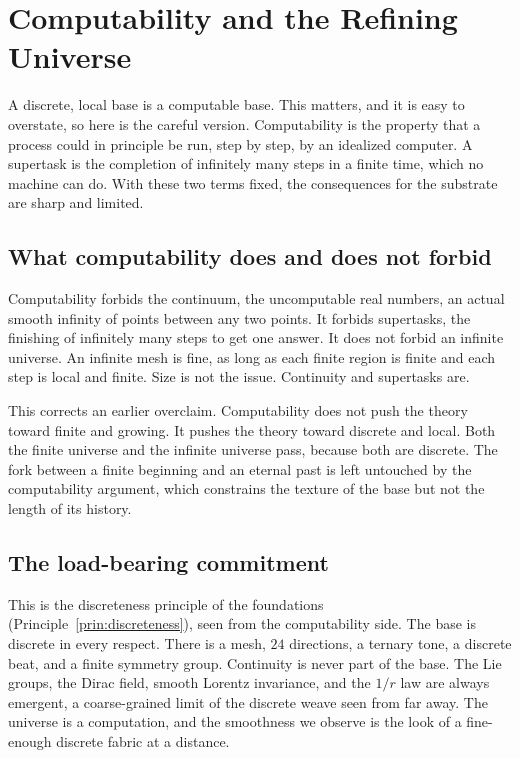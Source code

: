 \section{Computability and the Refining Universe}

A discrete, local base is a computable base. This matters, and it is easy to overstate, so here is the careful
version. Computability is the property that a process could in principle be run, step by step, by an idealized
computer. A supertask is the completion of infinitely many steps in a finite time, which no machine can do. With
these two terms fixed, the consequences for the substrate are sharp and limited.

\subsection{What computability does and does not forbid}

Computability forbids the continuum, the uncomputable real numbers, an actual smooth infinity of points between
any two points. It forbids supertasks, the finishing of infinitely many steps to get one answer. It does not
forbid an infinite universe. An infinite mesh is fine, as long as each finite region is finite and each step is
local and finite. Size is not the issue. Continuity and supertasks are.

This corrects an earlier overclaim. Computability does not push the theory toward finite and growing. It pushes
the theory toward discrete and local. Both the finite universe and the infinite universe pass, because both are
discrete. The fork between a finite beginning and an eternal past is left untouched by the computability argument,
which constrains the texture of the base but not the length of its history.

\subsection{The load-bearing commitment}

This is the discreteness principle of the foundations (Principle~\ref{prin:discreteness}), seen from the
computability side. The base is discrete in every respect. There is a mesh, $24$ directions, a ternary tone, a
discrete beat, and a finite symmetry group. Continuity is never part of the base. The Lie groups, the Dirac
field, smooth Lorentz invariance, and the $1/r$ law are always emergent, a coarse-grained limit of the discrete
weave seen from far away. The universe is a computation, and the smoothness we observe is the look of a
fine-enough discrete fabric at a distance.

